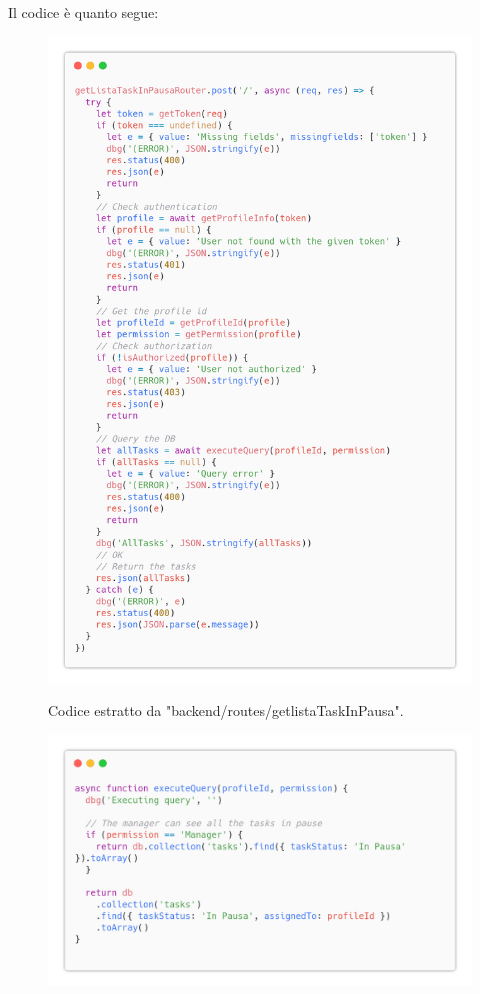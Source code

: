 \documentclass{report}
\begin{document}
Il codice è quanto segue:
\begin{figure}[H]
	\centering\includegraphics[width=1\textwidth]{images/code_in_pausa.png}
	
	Codice estratto da "backend/routes/getlistaTaskInPausa".
\end{figure}
\begin{figure}[H]
	\centering\includegraphics[width=1\textwidth]{images/code_in_paus2.png}
\end{figure}
\end{document}
